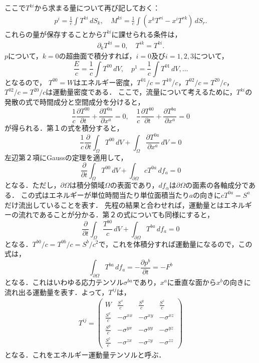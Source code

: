 \documentclass[a4paper]{ltjsreport}
\begin{document}
ここで$T^{ki}$から求まる量について再び記しておく：
\begin{align}
  p^i=\frac{1}{c}\int{T^{ki}}\,dS_k,\quad{}M^{ki}=\frac{1}{c}\int\left(x^kT^{ri} - x^iT^{rk}\right)\,dS_r.
\end{align}
これらの量が保存することから$T^{ki}$に課せられる条件は，
\begin{align}
  \partial_k{T^{ki}}=0,\quad{}T^{ik}=T^{ki}.
\end{align}
$p$について，$k=0$の超曲面で積分すれば，$i=0$及び$i=1,2,3$について，
\[\frac{E}{c}=\frac{1}{c}\int{T^{00}}\,dV,\quad{}p^1=\frac{1}{c}\int{T^{01}}\,dV,\ldots\]
となるので，
$T^{00}=W$はエネルギー密度，$T^{01}/c=T^{10}/c$，$T^{02}/c=T^{20}/c$，$T^{02}/c=T^{20}/c$は運動量密度である．
ここで，流量について考えるために，$T^{ki}$の発散の式で時間成分と空間成分を分けると，
\[\frac{1}{c}\frac{\partial{T^{00}}}{\partial{t}} + \frac{\partial{T^{0a}}}{\partial{x^a}}=0,\quad\frac{1}{c}\frac{\partial{T^{b0}}}{\partial{t}} + \frac{\partial{T^{ba}}}{\partial{x^a}}=0\]
が得られる．第１の式を積分すると，
\[\frac{1}{c}\frac{\partial}{\partial{t}}\int_{\Omega}{T^{00}}\,dV + \int_{\Omega}\frac{\partial{T^{0a}}}{\partial{x^a}}\,dV=0\]
左辺第２項にGaussの定理を適用して，
\[\frac{\partial}{\partial{t}}\int_{\Omega}{T^{00}}\,dV + \int_{\partial\Omega}cT^{0a}\,df_a=0\]
となる．ただし，$\partial\Omega$は積分領域$\Omega$の表面であり，$df_\alpha$は$\partial\Omega$の面素の各軸成分である．
この式はエネルギーが単位時間当たり単位面積当たり$a$の向きに$cT^{0a}=S^a$だけ流出していることを表す．
先程の結果と合わせれば，運動量とはエネルギーの流れであることが分かる．第２の式についても同様にすると，
\[\frac{\partial}{\partial{t}}\int_{\Omega}\frac{T^{b0}}{c}{}\,dV + \int_{\partial\Omega}T^{ba}\,df_a=0\]
となる．$T^{b0}/c=T^{0b}/c=S^b/c^2$で，これを体積分すれば運動量になるので，この式は，
\[\int_{\partial\Omega}T^{ba}\,df_a= - \frac{\partial{}p^b}{\partial{t}}= - F^{b}\]
となる．これはいわゆる応力テンソル$\sigma^{ba}$であり，$x^a$に垂直な面から$x^b$の向きに流れ出る運動量を表す．よって，$T^{ij}$は，
\begin{align}
  T^{ij}=
  \begin{pmatrix}
    W & \frac{S^x}{c} & \frac{S^y}{c} & \frac{S^z}{c}\\
    \frac{S^x}{c} &  - \sigma^{xx} &  - \sigma^{xy} &  - \sigma^{xz}\\
    \frac{S^y}{c} &  - \sigma^{yx} &  - \sigma^{yy} &  - \sigma^{yz}\\
    \frac{S^z}{c} &  - \sigma^{zx} &  - \sigma^{zy} &  - \sigma^{zz}
  \end{pmatrix}
\end{align}
となる．これをエネルギー運動量テンソルと呼ぶ．
\end{document}
